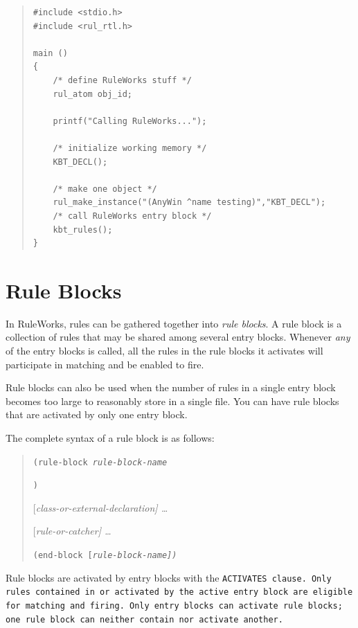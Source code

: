 \begin{quote}
\begin{verbatim}
#include <stdio.h>
#include <rul_rtl.h>

main ()
{
    /* define RuleWorks stuff */
    rul_atom obj_id;

    printf("Calling RuleWorks...");

    /* initialize working memory */
    KBT_DECL();

    /* make one object */
    rul_make_instance("(AnyWin ^name testing)","KBT_DECL");
    /* call RuleWorks entry block */
    kbt_rules();
}
\end{verbatim}
\end{quote}

\section{Rule Blocks}

In RuleWorks, rules can be gathered together into \emph{rule
  blocks}. A rule block is a collection of rules that may be shared
among several entry blocks. Whenever \emph{any} of the entry blocks is
called, all the rules in the rule blocks it activates will participate
in matching and be enabled to fire.

Rule blocks can also be used when the number of rules in a single
entry block becomes too large to reasonably store in a single file.
You can have rule blocks that are activated by only one entry block.

The complete syntax of a rule block is as follows:

\begin{quote}
  \tt{(rule-block} \it{rule-block-name}
  

\tt{)}

[\it{class-or-external-declaration}] \ldots

[\it{rule-or-catcher}] \ldots

\tt{(end-block} [\it{rule-block-name}]\tt{)}
\end{quote}

Rule blocks are activated by entry blocks with the \tt{ACTIVATES}
clause. Only rules contained in or activated by the active entry block
are eligible for matching and firing. Only entry blocks can activate
rule blocks; one rule block can neither contain nor activate another.

